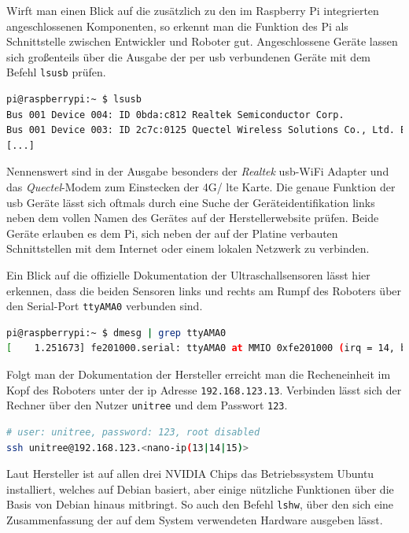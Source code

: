 Wirft man einen Blick auf die zusätzlich zu den im Raspberry Pi integrierten angeschlossenen Komponenten, so erkennt
man die Funktion des Pi als Schnittstelle zwischen Entwickler und Roboter gut.
Angeschlossene Geräte lassen sich großenteils über die Ausgabe der per \gls{usb} verbundenen Geräte mit dem Befehl
\texttt{lsusb} prüfen.

\begin{lstlisting}[language=sh, label=lst:pi-usb]
pi@raspberrypi:~ $ lsusb
Bus 001 Device 004: ID 0bda:c812 Realtek Semiconductor Corp.
Bus 001 Device 003: ID 2c7c:0125 Quectel Wireless Solutions Co., Ltd. EC25 LTE modem
[...]
\end{lstlisting}

Nennenswert sind in der Ausgabe besonders der \emph{Realtek} \gls{usb}-WiFi Adapter und das \emph{Quectel}-Modem zum
Einstecken der 4G/ \gls{lte} Karte.
Die genaue Funktion der \gls{usb} Geräte lässt sich oftmals durch eine Suche der Geräteidentifikation links neben dem
vollen Namen des Gerätes auf der Herstellerwebsite prüfen.
Beide Geräte erlauben es dem Pi, sich neben der auf der Platine verbauten Schnittstellen mit dem Internet oder einem lokalen
Netzwerk zu verbinden.

Ein Blick auf die offizielle Dokumentation der Ultraschallsensoren lässt hier erkennen, dass die beiden Sensoren links und rechts
am Rumpf des Roboters über den Serial-Port \texttt{ttyAMA0} verbunden sind.

\begin{lstlisting}[language=sh, label=lst:pi-ultrasonic]
pi@raspberrypi:~ $ dmesg | grep ttyAMA0
[    1.251673] fe201000.serial: ttyAMA0 at MMIO 0xfe201000 (irq = 14, base_baud = 0) is a PL011 rev2
\end{lstlisting}

\label{par:nano-kopf}

Folgt man der Dokumentation der Hersteller erreicht man die Recheneinheit im Kopf des Roboters unter der \gls{ip} Adresse \texttt{192.168.123.13}.
Verbinden lässt sich der Rechner über den Nutzer \texttt{unitree} und dem Passwort \texttt{123}.

\begin{lstlisting}[language=sh, label=lst:nanos-ssh]
# user: unitree, password: 123, root disabled
ssh unitree@192.168.123.<nano-ip(13|14|15)>
\end{lstlisting}

Laut Hersteller ist auf allen drei NVIDIA Chips das Betriebssystem Ubuntu installiert, welches auf Debian basiert, aber einige nützliche
Funktionen über die Basis von Debian hinaus mitbringt.
So auch den Befehl \texttt{lshw}, über den sich eine Zusammenfassung der auf dem System verwendeten Hardware ausgeben lässt.

